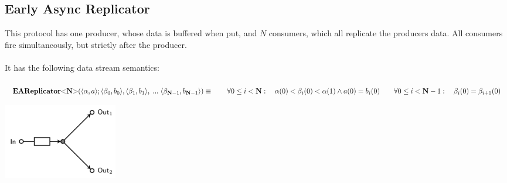 \subsection{Early Async Replicator}
\begin{minipage}{.65\textwidth}
  This protocol has one producer, whose data is buffered when put, and $N$ consumers, which all replicate the producers data.
  All consumers fire simultaneously, but strictly after the producer.\\\\
  It has the following data stream semantics:\\\\
  $
  \vspace{0.2cm}\earep (\langle \alpha, a \rangle ; \langle \beta_0, b_0 \rangle, \langle \beta_1, b_1 \rangle,\; ... \; \langle \beta_{\textbf{N}-1}, b_{\textbf{N}-1} \rangle) \equiv \\
  \vspace{0.2cm} \hphantom \qquad \forall 0 \leq i < \textbf{N} : \quad \alpha(0) < \beta_i(0) < \alpha(1) \land a(0) = b_i(0) \\
  \hphantom \qquad\forall 0 \leq i < \textbf{N}-1 :\quad \beta_i(0) = \beta_{i+1}(0)
  $
\end{minipage}\hfill
\begin{minipage}{.25\textwidth}
  \includegraphics[width=5cm]{img/EARep.png}\\
\end{minipage}

